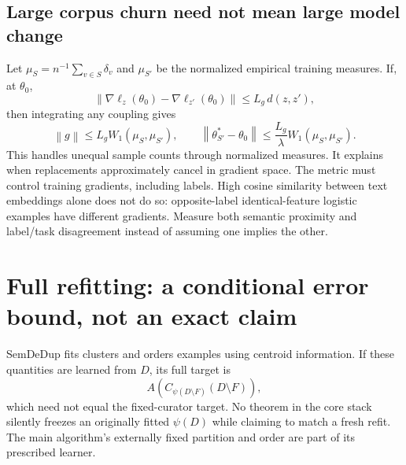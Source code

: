 \documentclass[11pt,a4paper]{article}
\theoremstyle{definition}\newtheorem{definition}[theorem]{Definition}
\newcommand{\norm}[1]{\left\lVert #1\right\rVert}
\newcommand{\minus}{\setminus}
\begin{document}
\subsection{Large corpus churn need not mean large model change}
Let $\mu_S=n^{-1}\sum_{v\in S}\delta_v$ and $\mu_{S'}$ be the normalized empirical training measures. If, at $\theta_0$,
\[
 \norm{\nabla\ell_z(\theta_0)-\nabla\ell_{z'}(\theta_0)}
 \le L_g\,d(z,z'),
\]
then integrating any coupling gives
\begin{equation}
 \norm g\le L_g W_1(\mu_S,\mu_{S'}),\qquad
 \norm{\theta^*_{S'}-\theta_0}\le\frac{L_g}{\lambda}W_1(\mu_S,\mu_{S'}).
\end{equation}
This handles unequal sample counts through normalized measures. It explains when replacements approximately cancel in gradient space. The metric must control training gradients, including labels. High cosine similarity between text embeddings alone does not do so: opposite-label identical-feature logistic examples have different gradients. Measure both semantic proximity and label/task disagreement instead of assuming one implies the other.

\section{Full refitting: a conditional error bound, not an exact claim}\label{sec:refit}
SemDeDup fits clusters and orders examples using centroid information. If these quantities are learned from $D$, its full target is
\[
 A\!\left(C_{\psi(D\minus F)}(D\minus F)\right),
\]
which need not equal the fixed-curator target. No theorem in the core stack silently freezes an originally fitted $\psi(D)$ while claiming to match a fresh refit. The main algorithm's externally fixed partition and order are part of its prescribed learner.
\end{document}
